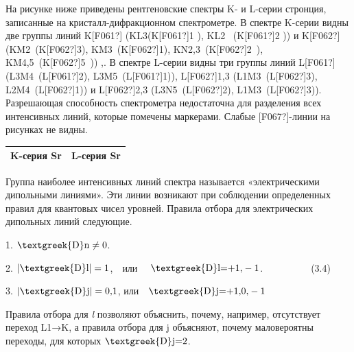\documentclass[a4paper,14pt, openany, twoside, draft]{extbook} %
\begin{document}
На рисунке ниже приведены рентгеновские спектры K- и L-серии стронция, записанные на кристалл-дифракционном спектрометре. В спектре K-серии видны две группы линий K\textlatin{[F061?]} (KL3(K\textlatin{[F061?]}1 ),  KL2~ (K\textlatin{[F061?]}2 )) и K\textlatin{[F062?]} (KM2~(K\textlatin{[F062?]}3), KM3~(K\textlatin{[F062?]}1), KN2,3~(K\textlatin{[F062?]}2~), KM4,5~(K\textlatin{[F062?]}5~)) ,. В спектре L-серии видны три группы линий L\textlatin{[F061?]} (L3M4~(L\textlatin{[F061?]}2), L3M5~(L\textlatin{[F061?]}1)), L\textlatin{[F062?]}1,3 (L1M3~(L\textlatin{[F062?]}3), L2M4~(L\textlatin{[F062?]}1)) и L\textlatin{[F062?]}2,3 (L3N5~(L\textlatin{[F062?]}2), L1M3~(L\textlatin{[F062?]}3)). Разрешающая способность спектрометра недостаточна для разделения всех интенсивных линий, которые помечены маркерами. Слабые \textlatin{[F067?]}-линии на рисунках не видны.

\begin{flushleft}
\tablefirsthead{}
\tablehead{}
\tabletail{}
\tablelasttail{}
\begin{supertabular}{|m{7.7970004cm}|m{7.84cm}|}
\hline
{\centering{} K-серия Sr\par}

 &
{\centering{} L{}-серия Sr\par}

\centering{}\\\hline
\end{supertabular}
\end{flushleft}
Группа наиболее интенсивных линий спектра называется «электрическими дипольными линиями». Эти линии возникают при соблюдении определенных правил для квантовых чисел уровней. Правила отбора для электрических дипольных линий следующие.

1.   ${\text{\textgreek{D}n}}\neq 0$.\ \ \ \ \ \ \ \ \ \ \ \ \ \

2.   $|{\text{\textgreek{D}l}}|=1$,\ \  или \ \  ${\text{\textgreek{D}l}}\text{=+1,}-1$.\ \ \ \ \ \ \ \ \ \ (3.4)

3.   $|{\text{\textgreek{D}j}}|=\text{0,1}$, или\ \  ${\text{\textgreek{D}j}}\text{=+1,0,}-1$\ \ \ \ \ \ \ \

Правила отбора для \emph{l} позволяют объяснить, почему, например, отсутствует переход L1→K, а правила отбора для j объясняют, почему маловероятны переходы, для которых  ${\text{\textgreek{D}j=}}2$.
\end{document}
